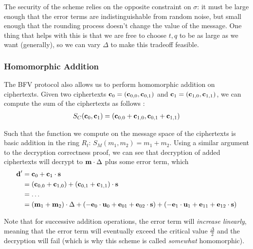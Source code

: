 \documentclass{theme}
\begin{document}
The security of the scheme relies on the opposite constraint on $\sigma$: it must be large enough that the error terms are indistinguishable from random noise, but small enough that the rounding process doesn't change the value of the message. One thing that helps with this is that we are free to choose $t,q$ to be as large as we want (generally), so we can vary $\Delta$ to make this tradeoff feasible.

\subsubsection{Homomorphic Addition}

The BFV protocol also allows us to perform homomorphic addition on ciphertexts. Given two ciphertexts $\textbf{c}_0 = (\textbf{c}_{0,0}, \textbf{c}_{0,1})$ and $\textbf{c}_1 = (\textbf{c}_{1,0}, \textbf{c}_{1,1})$, we can compute the sum of the ciphertexts as follows \cite{fhe}:
\begin{align}
    S_C(\textbf{c}_0, \textbf{c}_1) = (\textbf{c}_{0,0} + \textbf{c}_{1,0}, \textbf{c}_{0,1} + \textbf{c}_{1,1})
\end{align}

Such that the function we compute on the message space of the ciphertexts is basic addition in the ring $R_t$: $S_M(m_1, m_2) = m_1 + m_2$. Using a similar argument to the decryption correctness proof, we can see that decryption of added ciphertexts will decrypt to $\textbf{m} \cdot \Delta$ plus some error term, which
\begin{align}
    \textbf{d}' & = \textbf{c}_0 + \textbf{c}_1 \cdot \textbf{s}                                                                                                                                        \\
           & = (\textbf{c}_{0,0} + \textbf{c}_{1,0}) + (\textbf{c}_{0,1} + \textbf{c}_{1,1}) \cdot \textbf{s}                                                                                                \\
           & = \ldots                                                                                                                                                               \\
           & = (\textbf{m}_1 + \textbf{m}_2) \cdot \Delta + (- \textbf{e}_0 \cdot \textbf{u}_0 + \textbf{e}_{01} + \textbf{e}_{02} \cdot \textbf{s}) + (- \textbf{e}_1 \cdot \textbf{u}_1 + \textbf{e}_{11} + \textbf{e}_{12} \cdot \textbf{s})
\end{align}

Note that for successive addition operations, the error term will \textit{increase linearly}, meaning that the error term will eventually exceed the critical value $\frac{\Delta}{2}$ and the decryption will fail (which is why this scheme is called \textit{somewhat} homomorphic).
\end{document}
